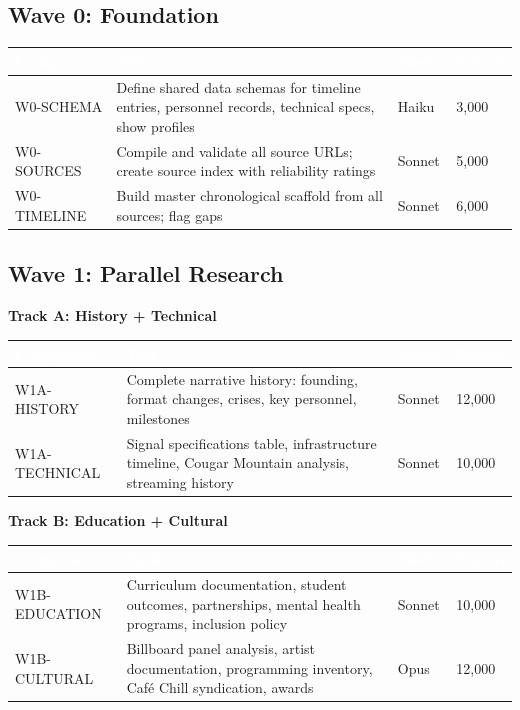 \documentclass[11pt,letterpaper]{article}
\newcommand{\tableheader}[1]{\textbf{\sffamily\textcolor{white}{#1}}}
\begin{document}
\subsection{Wave 0: Foundation}

\begin{center}
\begin{tabularx}{\textwidth}{L{2.5cm}XC{1.5cm}C{2cm}}
\toprule
{}
\tableheader{Component} & \tableheader{Task} & \tableheader{Model} & \tableheader{Tokens} \\
\midrule
W0-SCHEMA & Define shared data schemas for timeline entries, personnel records, technical specs, show profiles & Haiku & 3,000 \\
W0-SOURCES & Compile and validate all source URLs; create source index with reliability ratings & Sonnet & 5,000 \\
W0-TIMELINE & Build master chronological scaffold from all sources; flag gaps & Sonnet & 6,000 \\
\bottomrule
\end{tabularx}
\end{center}

\subsection{Wave 1: Parallel Research}

\textbf{Track A: History + Technical}

\begin{center}
\begin{tabularx}{\textwidth}{L{2.5cm}XC{1.5cm}C{2cm}}
\toprule
{}
\tableheader{Component} & \tableheader{Task} & \tableheader{Model} & \tableheader{Tokens} \\
\midrule
W1A-HISTORY & Complete narrative history: founding, format changes, crises, key personnel, milestones & Sonnet & 12,000 \\
W1A-TECHNICAL & Signal specifications table, infrastructure timeline, Cougar Mountain analysis, streaming history & Sonnet & 10,000 \\
\bottomrule
\end{tabularx}
\end{center}

\textbf{Track B: Education + Cultural}

\begin{center}
\begin{tabularx}{\textwidth}{L{2.5cm}XC{1.5cm}C{2cm}}
\toprule
{}
\tableheader{Component} & \tableheader{Task} & \tableheader{Model} & \tableheader{Tokens} \\
\midrule
W1B-EDUCATION & Curriculum documentation, student outcomes, partnerships, mental health programs, inclusion policy & Sonnet & 10,000 \\
W1B-CULTURAL & Billboard panel analysis, artist documentation, programming inventory, Café Chill syndication, awards & Opus & 12,000 \\
\bottomrule
\end{tabularx}
\end{center}
\end{document}
